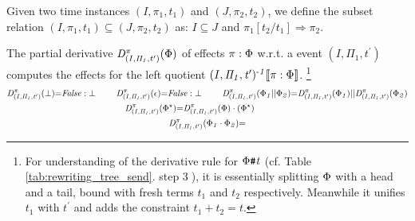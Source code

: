 \documentclass[acmsmall,10pt,review]{acmart}
\newcommand{\timedEffects}{\emph{TimEffs}}
\newcommand{\effect}{\textcolor{black}{\ensuremath{\mathrm{\Phi}}}}
\newcommand{\seq}{\cdot}
\newcommand{\code}[1]{{\tt{\ensuremath{\m{#1}}}}}
\newcommand{\empt}{\textcolor{black}{\ensuremath{\epsilon}}}
\newcommand{\bott}{\textcolor{black}{\ensuremath{\bot}}}
\newcommand{\m}{\mathit}
\newcommand{\mysharp}{{\mathrel{\texttt{\#}}}}
\newcommand\tabref[1]{Table \textcolor{black}{\ref{#1}}.}
\begin{document}
{\begin{definition}
\end{definition}


\begin{definition}\label{Subsumption1}
Given two time instances \code{(I, \pi_1, t_1)} and \code{(J, \pi_2, t_2)}, we define the subset relation \code{(I, \pi_1, t_1) {\subseteq} (J, \pi_2, t_2)} as:  \code{I {\subseteq} J} and \code{\pi_1[t_2/t_1]  {\Rightarrow}   \pi_2  }.

\end{definition}

\begin{definition}[Partial Derivative\footnote{Intuitively, the partial derivative refers to the left quotient of a language equation, for example, for REs, \code{x^{{-}1} \llbracket x\cdot y\rrbracket {=} y};  \code{y^{{-}1} \llbracket x\cdot y\rrbracket {=} \bott}; and  \code{y^{{-}1} \llbracket x + y\rrbracket {=} \epsilon}. Here we come up with a new notion of partial derivative for \timedEffects. 
}]\label{Derivative}
The partial derivative \code{D^{\pi}_{(I, \Pi_1, t^\prime)}(\effect)} 
of effects \code{\pi : \effect} 
w.r.t. a event \code{(I, \Pi_1, t^\prime)} computes the  effects for the left quotient \code{(I, \Pi_1, t^\prime)^{\text{-}1}\llbracket \pi : \effect \rrbracket}. \footnote{For understanding of the derivative rule for \code{\effect\mysharp  t} (cf. \tabref{tab:rewriting_tree_send}  step \textcircled{3}), it is essentially splitting \code{\effect} with a head and a tail, bound with fresh terms \code{t_1} and \code{t_2} respectively. Meanwhile it unifies \code{t_1} with \code{t^\prime} and  adds the constraint \code{t_1 {+} t_2 {=} t}.}
\begin{gather*}
\code{D^{\pi}_{(I, \Pi_1, t^\prime)}(\bott) {=}}  
 \code{False : \bott} 
\qquad\ 
\code{D^{\pi}_{(I, \Pi_1, t^\prime)}(  \empt) {=}}   
\code{False : \bott} 
\qquad \ 
\code{D^{\pi}_{(I, \Pi_1, t^\prime)}(\effect_1 ||\effect_2)} {=} \code{D^{\pi}_{(I, \Pi_1, t^\prime)}(\effect_1)} || \code{D^{\pi}_{(I, \Pi_1, t^\prime)}(\effect_2)} 
    \\
        \code{D^{\pi}_{(I, \Pi_1, t^\prime)}(  {\effect^\star}) } {=} \code{ D^{\pi}_{(I, \Pi_1, t^\prime)}(  {\effect}) \cdot ({\effect^\star})}  
        \qquad\qquad
\\
{
 \code{D^{\pi}_{(I, \Pi_1, t^\prime)}(   \effect_1 \seq \effect_2) {=} }
}
\end{gather*}
\end{definition}}
\end{document}
